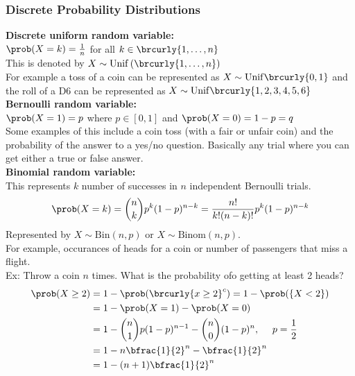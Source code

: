 \subsubsection{Discrete Probability Distributions}
\textbf{Discrete uniform random variable:}\\
$\prob(X=k)=\frac{1}{n}$ for all $k\in\brcurly{1,\ldots,n}$\\
This is denoted by $X\sim\mathrm{Unif}\,(\brcurly{1,\ldots,n})$\\
For example a toss of a coin can be represented as $X\sim\mathrm{Unif}\brcurly{0,1}$ and the roll of a D6 can be represented as $X\sim\mathrm{Unif}\brcurly{1,2,3,4,5,6}$\\
\textbf{Bernoulli random variable:}\\
$\prob(X=1)=p$ where $p\in[0,1]$ and $\prob(X=0)=1-p=q$\\
Some examples of this include a coin toss (with a fair or unfair coin) and the probability of the answer to a yes/no question. Basically any trial where you can get either a true or false answer.\\
\textbf{Binomial random variable:}\\
This represents $k$ number of successes in $n$ independent Bernoulli trials.\\
\[\prob(X=k)=\binom{n}{k}p^k(1-p)^{n-k}=\frac{n!}{k!(n-k)!}p^k(1-p)^{n-k}\]
Represented by $X\sim\mathrm{Bin}(n,p)$ or $X\sim\mathrm{Binom}(n,p)$.\\
For example, occurances of heads for a coin or number of passengers that miss a flight.\\
Ex: Throw a coin $n$ times. What is the probability ofo getting at least 2 heads?
\begin{align*}
    \prob(X\geq2)&=1-\prob(\brcurly{x\geq2}^c)=1-\prob(\{X<2\})\\
    &=1-\prob(X=1)-\prob(X=0)\\
    &=1-\binom{n}{1}p(1-p)^{n-1}-\binom{n}{0}(1-p)^n,\ \quad p=\frac{1}{2}\\
    &=1-n\bfrac{1}{2}^n-\bfrac{1}{2}^n\\
    &=1-(n+1)\bfrac{1}{2}^n
\end{align*}

